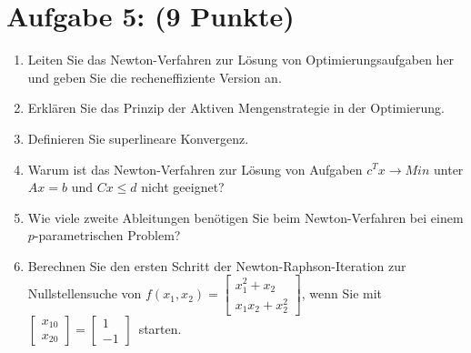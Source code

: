 \documentclass[12pt]{article}
\begin{document}
\pagebreak

\newcommand{\raphsonFunction}{
	$f(x_1,x_2) = 
		\begin{bmatrix}
			x_1^2 + x_2\\ x_1x_2 + x_2^2
		\end{bmatrix}$}

\newcommand{\raphsonStartVal}{
	$\begin{bmatrix}x_{10} \\ x_{20}\end{bmatrix}
	= 
	\begin{bmatrix}1\\ -1\end{bmatrix}$}

\section*{Aufgabe 5: (9 Punkte)}
\begin{enumerate}

	\item Leiten Sie das Newton-Verfahren zur Lösung von Optimierungsaufgaben her und geben Sie die recheneffiziente Version an.
	
	\vspace{4cm}
	
	\item Erklären Sie das Prinzip der Aktiven Mengenstrategie in der Optimierung.
	
	\vspace{2cm}
	
	\item Definieren Sie superlineare Konvergenz.
	
	\vspace{2cm}
	
	\item Warum ist das Newton-Verfahren zur Lösung von Aufgaben $c^T x \rightarrow Min$ unter $Ax = b$ und $Cx \leq d$ nicht geeignet?
	
	\vspace{1.5cm}
	
	\item Wie viele zweite Ableitungen benötigen Sie beim Newton-Verfahren bei einem $p$-parametrischen Problem?
	
	\vspace{1.5cm}
	
	\item Berechnen Sie den ersten Schritt der Newton-Raphson-Iteration zur Nullstellensuche von \raphsonFunction, wenn Sie mit \raphsonStartVal\, starten.


\end{enumerate}
\end{document}

